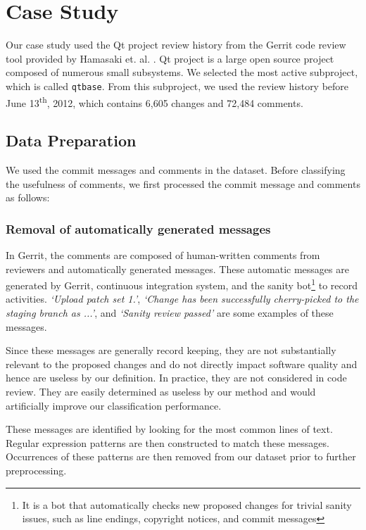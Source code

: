 
\section{Case Study}

Our case study used the Qt project review history from the Gerrit code review tool provided by Hamasaki et. al. \cite{Hamasaki2013}. Qt project is a large open source project composed of numerous small subsystems. We selected the most active subproject, which is called \texttt{qtbase}.
From this subproject, we used the review history before June 13\textsuperscript{th}, 2012, which contains 6,605 changes and 72,484 comments.


\subsection{Data Preparation}
We used the commit messages and comments in the dataset.
Before classifying the usefulness of comments, we first processed the commit message and comments as follows: 

\subsubsection{Removal of automatically generated messages}
In Gerrit, the comments are composed of human-written comments from reviewers and automatically generated messages.
These automatic messages are generated by Gerrit, continuous integration system, and the sanity bot\footnote{It is a bot that automatically checks new proposed changes for trivial sanity issues, such as line endings, copyright notices, and commit messages} to record activities.
\textit{`Upload patch set 1.'}, \textit{`Change has been successfully cherry-picked to the staging branch as ...'}, and \textit{`Sanity review passed'} are some examples of these messages.

Since these messages are generally record keeping,
they are not substantially relevant to the proposed changes and do not directly impact software quality\cite{Mcintosh} and hence are useless by our definition.
In practice, they are not considered in code review.
They are easily determined as useless by our method and would artificially improve our classification performance.

These messages are identified by looking for the most common lines of text.
Regular expression patterns are then constructed to match these messages.
Occurrences of these patterns are then removed from our dataset prior to further preprocessing.

